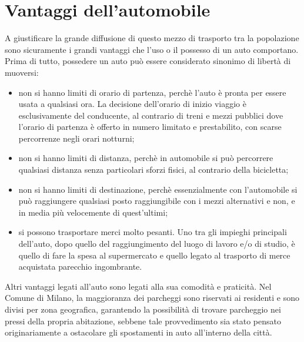 \section{Vantaggi dell'automobile}

A giustificare la grande diffusione di questo mezzo di trasporto tra la popolazione sono sicuramente i grandi vantaggi che l'uso o il possesso di un auto comportano. Prima di tutto, possedere un auto può essere considerato sinonimo di libertà di muoversi:
\begin{itemize}
	\item non si hanno limiti di orario di partenza, perchè l'auto è pronta per essere usata a qualsiasi ora. La decisione dell'orario di inizio viaggio è esclusivamente del conducente, al contrario di treni e mezzi pubblici dove l'orario di partenza è offerto in numero limitato e prestabilito, con scarse percorrenze negli orari notturni;
	\item non si hanno limiti di distanza, perchè in automobile si può percorrere qualsiasi distanza senza particolari sforzi fisici, al contrario della bicicletta;
	\item non si hanno limiti di destinazione, perchè essenzialmente con l'automobile si può raggiungere qualsiasi posto raggiungibile con i mezzi alternativi e non, e in media più velocemente di quest'ultimi;
	\item si possono trasportare merci molto pesanti. Uno tra gli impieghi principali dell'auto, dopo quello del raggiungimento del luogo di lavoro e/o di studio, è quello di fare la spesa al supermercato e quello legato al trasporto di merce acquistata parecchio ingombrante.
\end{itemize}
Altri vantaggi legati all'auto sono legati alla sua comodità e praticità. Nel Comune di Milano, la maggioranza dei parcheggi sono riservati ai residenti e sono divisi per zona geografica, garantendo la possibilità di trovare parcheggio nei pressi della propria abitazione, sebbene tale provvedimento sia stato pensato originariamente a ostacolare gli spostamenti in auto all'interno della città.























